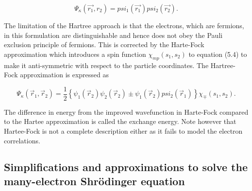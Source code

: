 \begin{equation}
\Psi_{\kappa}(\vec{r_1}, r_2) = psi_1(\vec{r_1})psi_2(\vec{r_2}).
\end{equation}

The limitation of the Hartree approach is that the electrons, which are fermions, in this formulation are distinguishable and hence does not obey the Pauli exclusion principle of fermions. This is corrected by the Harte-Fock approximation which introduces a spin function $\chi_{mp}(s_1, s_2)$ to equation (5.4) to make it anti-symmetric with respect to the particle coordinates. The Hartree-Fock approximation is expressed as

\begin{equation}
\Psi_{\kappa}(\vec{r}_1, \vec{r}_2) = \frac{1}{2} \left\{ \psi_1(\vec{r}_2) \psi_2(\vec{r}_2) \pm \psi_1(\vec{r}_2) psi_2(\vec{r}_1) \right\} \chi_{\mp}(s_1, s_2).
\end{equation}  

The difference in energy from the improved wavefunction in Harte-Fock compared to the Hartee approximation is called the exchange energy. Note however that Hartee-Fock is not a complete description either as it fails to model the electron correlations.  

\subsection{Simplifications and approximations to solve the many-electron Shr\"{o}dinger equation}

